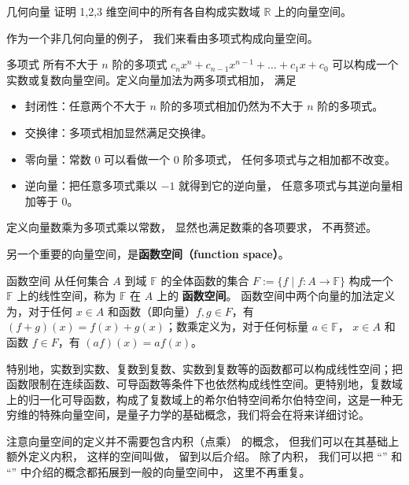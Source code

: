 \begin{exercise}{几何向量}
证明 1,2,3 维空间中的所有各自构成实数域 $\mathbb R$ 上的向量空间。
\end{exercise}

作为一个非几何向量的例子， 我们来看由多项式构成向量空间。

\begin{example}{多项式}\label{ex_LSpace_1}
所有不大于 $n$ 阶的多项式 $c_n x^n + c_{n-1} x^{n-1} + \dots + c_1 x + c_0$ 可以构成一个实数或复数向量空间。定义向量加法为两多项式相加， 满足
\begin{itemize}
\item 封闭性：任意两个不大于 $n$ 阶的多项式相加仍然为不大于 $n$ 阶的多项式。
\item 交换律：多项式相加显然满足交换律。
\item 零向量：常数 0 可以看做一个 0 阶多项式， 任何多项式与之相加都不改变。
\item 逆向量：把任意多项式乘以 $-1$ 就得到它的逆向量， 任意多项式与其逆向量相加等于 0。
\end{itemize}
定义向量数乘为多项式乘以常数， 显然也满足数乘的各项要求， 不再赘述。
\end{example}

另一个重要的向量空间，是\textbf{函数空间（function space）}。

\begin{example}{函数空间}\label{ex_LSpace_2}
从任何集合 $A$ 到域 $\mathbb{F}$ 的全体函数的集合 $F := \{f \mid f: A \to \mathbb{F} \}$ 构成一个 $\mathbb{F}$ 上的线性空间，称为 $\mathbb{F}$ 在 $A$ 上的 \textbf{函数空间}。 函数空间中两个向量的加法定义为，对于任何 $x \in A$ 和函数（即向量）$f, g\in F$，有 $(f+g)(x)=f(x)+g(x)$；数乘定义为，对于任何标量 $a \in \mathbb{F}$， $x \in A$ 和函数 $f \in F$，有 $(af)(x)=af(x)$。

特别地，实数到实数、复数到复数、实数到复数等的函数都可以构成线性空间；把函数限制在连续函数、可导函数等条件下也依然构成线性空间。更特别地，复数域上的归一化可导函数，构成了复数域上的希尔伯特空间希尔伯特空间，这是一种无穷维的特殊向量空间，是量子力学的基础概念，我们将会在将来详细讨论。
\end{example}

注意向量空间的定义并不需要包含内积（点乘） 的概念， 但我们可以在其基础上额外定义内积， 这样的空间叫做， 留到以后介绍。 除了内积， 我们可以把 “” 和 “” 中介绍的概念都拓展到一般的向量空间中， 这里不再重复。


